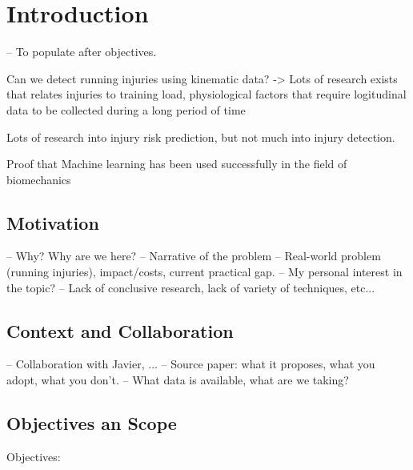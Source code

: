\chapter{Introduction}\label{chap:introduction}
-- To populate after objectives.

Can we detect running injuries using kinematic data? -> Lots of research exists that relates injuries to training load, physiological factors that require logitudinal data to be collected during a long period of time

Lots of research into injury risk prediction, but not much into injury detection.


Proof that Machine learning has been used successfully in the field of biomechanics 


\section{Motivation}\label{sec:intro-motivation}
-- Why? Why are we here?
-- Narrative of the problem
-- Real-world problem (running injuries), impact/costs, current practical gap.
-- My personal interest in the topic?
-- Lack of conclusive research, lack of variety of techniques, etc...

\section{Context and Collaboration}\label{sec:intro-context}
-- Collaboration with Javier, ...
-- Source paper: what it proposes, what you adopt, what you don't.
    -- What data is available, what are we taking?


\section{Objectives an Scope}\label{sec:intro-objectives-scope}
Objectives:\\

